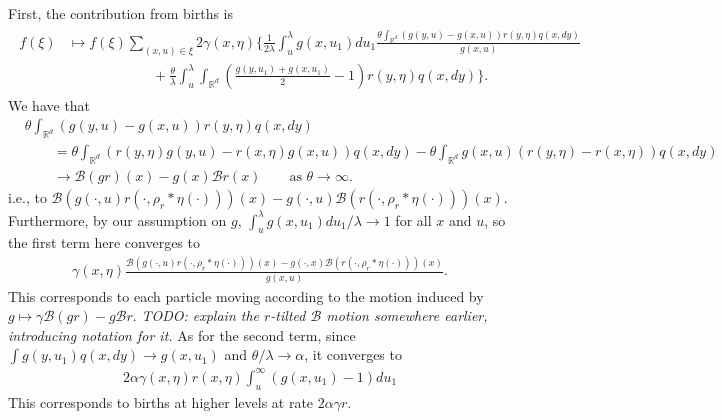 \documentclass[12pt]{article}
\newcommand{\IR}{\mathbb R}
\newcommand{\DG}{\mathcal{B}}  %
\newcommand{\kernel}{\rho}  %
\newcommand{\smooth}[1]{\kernel_{#1} \! * \!}  %
\newcommand{\lp}{\xi}              %
\newcommand{\comment}[1]{{\color{blue} \it #1}}
\begin{document}
First, the contribution from births is
\begin{align*}
\begin{split}
f(\lp)
&\mapsto
    f(\lp)
    \sum_{(x, u) \in \lp}
    2 \gamma(x, \eta)
    \bigg\{
        \frac{1}{2 \lambda}
        \int_u^\lambda
        g(x, u_1) du_1
        \frac{
            \theta \int_{\IR^d} (g(y, u) - g(x, u)) r(y, \eta) q(x, dy)
        }{
            g(x, u)
        }
    \\ & \qquad \qquad \qquad {}
        + \frac{\theta}{\lambda}
        \int_u^\lambda \int_{\IR^d}
        \left( \frac{g(y, u_1) + g(x, u_1)}{2} - 1 \right)
        r(y, \eta) q(x, dy)
    \bigg\}
    .
    \end{split}
\end{align*}
We have that
\begin{align*}
    &\theta \int_{\IR^d} (g(y, u) - g(x, u)) r(y, \eta) q(x, dy) \\
    &\qquad =
    \theta \int_{\IR^d} (r(y, \eta) g(y, u) - r(x, \eta) g(x, u)) q(x, dy)
    - \theta \int_{\IR^d} g(x, u) (r(y, \eta) - r(x, \eta)) q(x, dy) \\
    &\qquad \to
    \DG(gr)(x) - g(x) \DG r(x) \qquad \text{as }\theta \to \infty.
\end{align*}
i.e., to
$\DG\left(g(\cdot, u) r(\cdot, \smooth{r}\eta(\cdot))\right)(x)
- g(\cdot, u) \DG\left(r(\cdot, \smooth{r}\eta(\cdot))\right)(x)$.
Furthermore, by our assumption on $g$,
$\int_u^\lambda g(x, u_1) du_1 / \lambda \to 1$ for all $x$ and $u$,
so the first term here converges to
\begin{align*}
    \gamma(x, \eta)
        \frac{
            \DG\left( g(\cdot, u) r(\cdot, \smooth{r}\eta(\cdot))\right)(x)
            -
            g(\cdot, x) \DG\left( r(\cdot, \smooth{r}\eta(\cdot))\right)(x)
        }{
            g(x, u)
        } .
\end{align*}
This corresponds to each particle moving according to the motion induced by
$g \mapsto \gamma \DG(gr) - g \DG r$.
\comment{TODO: explain the $r$-tilted $\DG$ motion somewhere earlier, introducing notation for it.}
As for the second term,
since $\int g(y, u_1) q(x, dy) \to g(x, u_1)$
and $\theta/\lambda \to \alpha$,
it converges to
\begin{align*}
    2 \alpha
    \gamma(x, \eta)
    r(x, \eta) 
    \int_u^\infty
    \left( g(x, u_1) - 1 \right)
    du_1
\end{align*}
This corresponds to births at higher levels at rate $2 \alpha \gamma r$.
\end{document}
